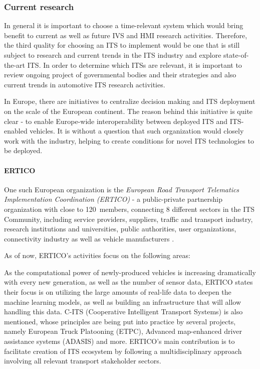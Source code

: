 \documentclass[main.tex]{subfiles}
\begin{document}
\subsubsection{Current research}\label{sec-research}

In general it is important to choose a time-relevant system which would bring benefit to
current as well as future IVS and HMI research activities. Therefore, the third quality for choosing 
an ITS to implement would be one that is still subject to research and current trends in 
the ITS industry and explore state-of-the-art ITS. In order to determine which ITSs are relevant, 
it is important to review ongoing project of governmental bodies and their strategies and also
current trends in automotive ITS research activities.

In Europe, there are initiatives to centralize decision making and ITS deployment on the scale of 
the European continent. The reason behind this initiative is quite clear - to enable Europe-wide 
interoperability between deployed ITS and ITS-enabled vehicles. It is without a question that 
such organization would closely work with the industry, helping to create conditions for novel 
ITS technologies to be deployed.

\paragraph{ERTICO}

One such European organization is the \emph{European Road Transport Telematics
Implementation Coordination (ERTICO)} - a public-private partnership organization
with close to 120~members, connecting 8 different sectors in the ITS Community, including
service providers, suppliers, traffic and transport industry, research institutions and
universities, public authorities, user organizations, connectivity industry as well as
vehicle manufacturers \cite{ertico}.

As of now, ERTICO's activities focus on the following areas:

As the computational power of newly-produced vehicles is increasing dramatically with every 
new generation, as well as the number of sensor data, ERTICO states their focus is on utilizing 
the large amounts of real-life data to deepen the machine learning models, as well as building 
an infrastructure that will allow handling this data. C-ITS (Cooperative Intelligent Transport
Systems) is also mentioned, whose principles are being put into practice by several projects, 
namely European Truck Platooning (ETPC), Advanced map-enhanced driver assistance systems (ADASIS) and 
more. ERTICO's main contribution is to facilitate creation of ITS ecosystem by following a
multidisciplinary approach involving all relevant transport stakeholder sectors.
\end{document}
